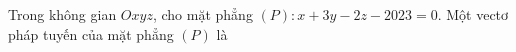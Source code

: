 \begin{ex}
Trong không gian $Oxyz$, cho mặt phẳng $(P)\colon x+3y-2z-2023=0$. Một vectơ pháp tuyến của mặt phẳng $(P)$ là
\end{ex}
